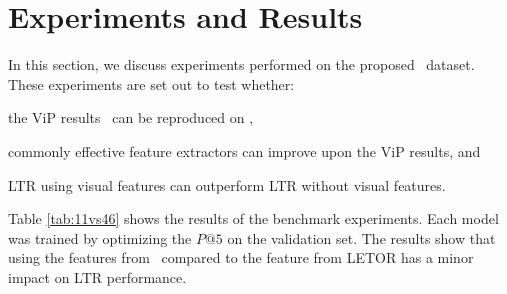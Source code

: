 
%


\newcommand{\OK}{@{\mbox{}\hspace*{.25cm}}}

\section{Experiments and Results}
In this section, we discuss experiments performed on the proposed \datasetname~dataset.
These experiments are set out to test whether:
\begin{inparaenum}[(i)]
\item the ViP results~\cite{fan2017learning} can be reproduced on \datasetname, 
\item commonly effective feature extractors can improve upon the ViP results, and
\item \ac{LTR} using visual features can outperform \ac{LTR} without visual features. \end{inparaenum}

Table \ref{tab:11vs46} shows the results of the benchmark experiments. Each model was trained by optimizing the $P@5$ on the validation set. The results show that using the features from \datasetname~compared to the feature from LETOR has a minor impact on \ac{LTR} performance.
\fi


